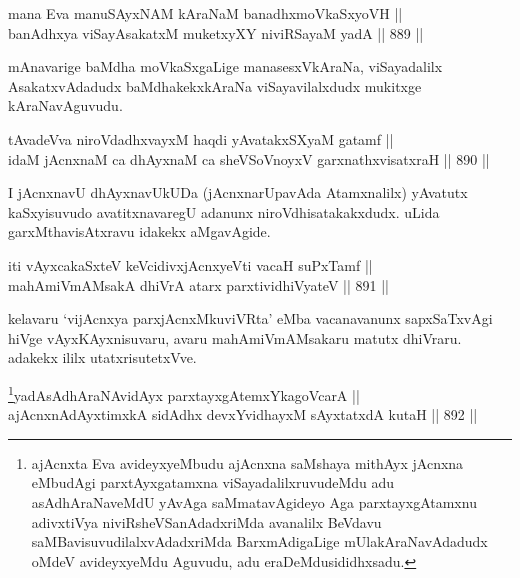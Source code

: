 
\begin{shl}
mana Eva manuSAyxNAM kAraNaM banadhxmoVkaSxyoVH || \\
banAdhxya viSayAsakatxM muketxyXY niviRSayaM yadA \hfill || 889 ||  
\end{shl}

\begin{artha}
mAnavarige baMdha moVkaSxgaLige manasesxVkAraNa, viSayadalilx AsakatxvAdadudx baMdhakekxkAraNa viSayavilalxdudx mukitxge kAraNavAguvudu.
\end{artha}


\begin{shl}
tAvadeVva niroVdadhxvayxM haqdi yAvatakxSXyaM gatamf || \\
idaM jAcnxnaM ca dhAyxnaM ca sheVSoV\s noyxV garxnathxvisatxraH \hfill || 890 ||  
\end{shl}

\begin{artha}
I jAcnxnavU dhAyxnavUkUDa (jAcnxnarUpavAda Atamxnalilx) yAvatutx kaSxyisuvudo avatitxnavaregU adanunx niroVdhisatakakxdudx. uLida garxMthavisAtxravu idakekx aMgavAgide.
\end{artha}


\begin{shl}
iti vAyxcakaSxteV keVcidivxjAcnxyeVti vacaH suPxTamf || \\
mahAmiVmAMsakA dhiVrA atarx parxtividhiVyateV \hfill || 891 ||  
\end{shl}

\begin{artha}
kelavaru `vijAcnxya parxjAcnxMkuviVRta' eMba vacanavanunx sapxSaTxvAgi hiVge vAyxKAyxnisuvaru, avaru mahAmiVmAMsakaru matutx dhiVraru. adakekx ililx utatxrisutetxVve.
\end{artha}



\begin{shl}
\footnote{ajAcnxta Eva avideyxyeMbudu ajAcnxna saMshaya mithAyx jAcnxna eMbudAgi parxtAyxgatamxna viSayadalilxruvudeMdu adu asAdhAraNaveMdU yAvAga saMmatavAgideyo Aga parxtayxgAtamxnu adivxtiVya niviRsheVSanAdadxriMda avanalilx BeVdavu saMBavisuvudilalxvAdadxriMda BarxmAdigaLige mUlakAraNavAdadudx oMdeV avideyxyeMdu Aguvudu, adu eraDeMdusididhxsadu.}yadA\s sAdhAraNA\s vidAyx parxtayxgAtemxYkagoVcarA || \\
ajAcnxnAdAyxtimxkA sidAdhx devxYvidhayxM sAyxtatxdA kutaH \hfill || 892 ||  
\end{shl}

